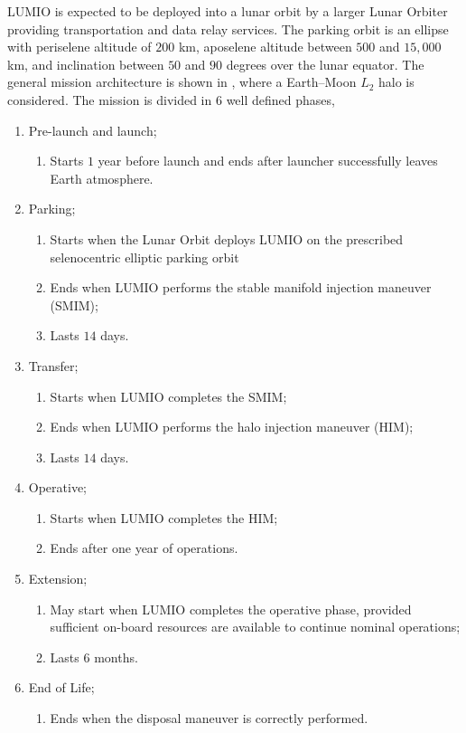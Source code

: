 LUMIO is expected to be deployed into a lunar orbit by a larger Lunar Orbiter providing transportation and data relay services. The parking orbit is an ellipse with periselene altitude of $200$ km, aposelene altitude between $500$ and $15,000$ km, and inclination between $50$ and $90$ degrees over the lunar equator. The general mission architecture is shown in , where a Earth--Moon $L_2$ halo is considered. The mission is divided in $6$ well defined phases,
%
\begin{enumerate}
	\item Pre-launch and launch;
	\begin{enumerate}[{1-}i.]
		\item Starts $1$ year before launch and ends after launcher successfully leaves Earth atmosphere.
	\end{enumerate}
	\item Parking;
	\begin{enumerate}[{2-}i.]
		\item Starts when the Lunar Orbit deploys LUMIO on the prescribed selenocentric elliptic parking orbit
		\item Ends when LUMIO performs the stable manifold injection maneuver (SMIM);
		\item Lasts $14$ days.
	\end{enumerate}
	\item Transfer;
	\begin{enumerate}[{3-}i.]
		\item Starts when LUMIO completes the SMIM;
		\item Ends when LUMIO performs the halo injection maneuver (HIM);
		\item Lasts $14$ days.
	\end{enumerate}
	\item Operative;
	\begin{enumerate}[{4-}i.]
		\item Starts when LUMIO completes the HIM;
		\item Ends after one year of operations.
	\end{enumerate}
	\item Extension;
	\begin{enumerate}[{5-}i.]
		\item May start when LUMIO completes the operative phase, provided sufficient on-board resources are available to continue nominal operations;
		\item Lasts $6$ months.
	\end{enumerate}
	\item End of Life;
	\begin{enumerate}[{6-}i.]
		\item Ends when the disposal maneuver is correctly performed.
	\end{enumerate}
\end{enumerate}
%


